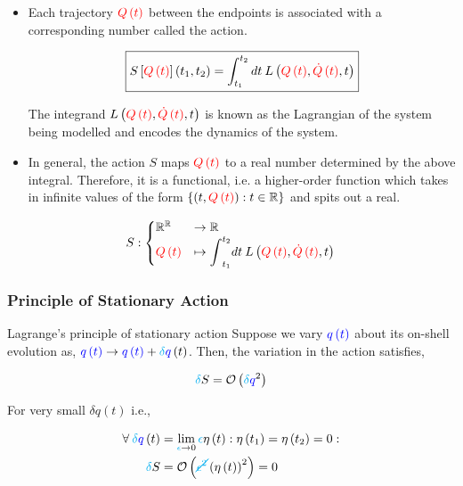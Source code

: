 \documentclass{beamer}
\begin{document}
\begin{frame}
\begin{itemize}
\item Each trajectory $\textcolor{red}{Q \left( t \right)}$ between the endpoints is associated with a corresponding number called the action.

$$\boxed{S \left[ \textcolor{red}{Q \left( t \right)} \right] \left( t_1, t_2 \right) = \int_{t_1}^{t_2} dt \: L \left( \textcolor{red}{Q \left( t \right)}, \textcolor{red}{\dot{Q} \left( t \right)}, t \right)}$$

The integrand $L \left( \textcolor{red}{Q \left( t \right)}, \textcolor{red}{\dot{Q} \left( t \right)}, t \right)$ is known as the Lagrangian of the system being modelled and encodes the dynamics of the system.

\item In general, the action $S$ maps $\textcolor{red}{Q \left( t \right)}$ to a real number determined by the above integral. Therefore, it is a functional, i.e. a higher-order function which takes in infinite values of the form $\left\{ \left( t, \textcolor{red}{Q \left( t \right)} \right) : t \in \mathbb{R} \right\}$ and spits out a real.
\end{itemize}

$$
S : \begin{cases} \mathbb{R}^\mathbb{R} & \to \mathbb{R} \\ \textcolor{red}{Q \left( t \right)} & \mapsto \displaystyle{\int}_{t_1}^{t_2} dt \: L \left( \textcolor{red}{Q \left( t \right)}, \textcolor{red}{\dot{Q} \left( t \right)}, t \right) \end{cases}
$$
\end{frame}

\begin{frame}
\frametitle{Principle of Stationary Action}

\begin{block}{Lagrange's principle of stationary action}
Suppose we vary $\textcolor{blue}{q \left( t \right)}$ about its on-shell evolution as, $\textcolor{blue}{q \left( t \right)} \to \textcolor{blue}{q \left( t \right)} + \textcolor{cyan}{\delta} \textcolor{blue}{q} \left( t \right)$. Then, the variation in the action satisfies,

$$\textcolor{cyan}{\delta} S = \mathcal{O} \left( \textcolor{cyan}{\delta} \textcolor{blue}{q}^2  \right)$$
\end{block}

\begin{corollary}
For very small $\delta q \left( t \right)$ i.e.,

\begin{align*}
\forall \: \textcolor{cyan}{\delta} \textcolor{blue}{q} \left( t \right) & = \lim_{\textcolor{cyan}{\epsilon} \to 0} \textcolor{cyan}{\epsilon} \eta \left( t \right) : \eta \left( t_1 \right) = \eta \left( t_2 \right) = 0 : \\
\textcolor{cyan}{\delta} S & = \mathcal{O} \left( \textcolor{cyan}{\cancel{\epsilon^2}} \left( \eta \left( t \right) \right)^2 \right) = 0
\end{align*}
\end{corollary}
\end{frame}
\end{document}
